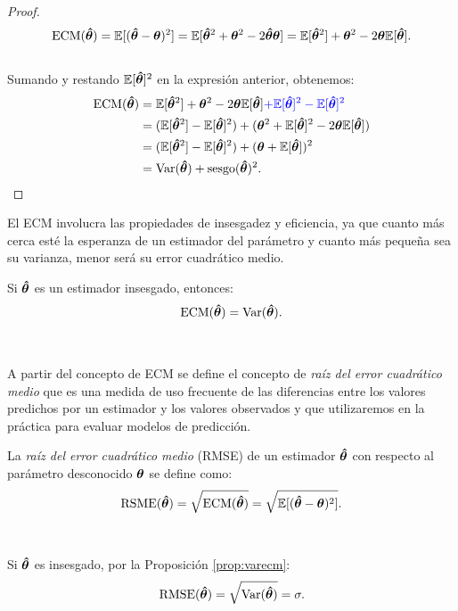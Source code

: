 \documentclass[oneside,openright,titlepage,numbers=noenddot,openany,headinclude,footinclude=true,
cleardoublepage=empty,abstractoff,BCOR=5mm,paper=a4,fontsize=12pt,main=spanish]{scrreprt}
\begin{document}
\begin{proof}
 $$\text{ECM}(\bm{\hat{\theta}})=\mathbb{E}[(\bm{\hat{\theta}}-\bm{\theta})^2]=\mathbb{E}[\bm{\hat{\theta}}^2+\bm{\theta}^2-2\bm{\hat{\theta}} \bm{\theta}]=\mathbb{E}[\bm{\hat{\theta}}^2]+\bm{\theta}^2-2\bm{\theta}\mathbb{E}[\bm{\hat{\theta}}].$$\\
Sumando y restando $\mathbb{E}[\bm{\hat{\theta}}]^2$ en la expresión anterior, obtenemos:\\
  \begin{equation*}
  \begin{split}
 \text{ECM}(\bm{\hat{\theta}})&=\mathbb{E}[\bm{\hat{\theta}}^2]+\bm{\theta}^2-2\bm{\theta}\mathbb{E}[\bm{\hat{\theta}}]\textcolor{blue}{+\mathbb{E}[\bm{\hat{\theta}}]^2-\mathbb{E}[\bm{\hat{\theta}}]^2}\\
 &=(\mathbb{E}[\bm{\hat{\theta}}^2]-\mathbb{E}[\bm{\hat{\theta}}]^2)+(\bm{\theta}^2+\mathbb{E}[\bm{\hat{\theta}}]^2-2\bm{\theta}\mathbb{E}[\bm{\hat{\theta}}])\\
 &=(\mathbb{E}[\bm{\hat{\theta}}^2]-\mathbb{E}[\bm{\hat{\theta}}]^2)+(\bm{\theta}+\mathbb{E}[\bm{\hat{\theta}}])^2\\
 &=\text{Var}(\bm{\hat{\theta}})+\text{sesgo}(\bm{\hat{\theta}})^2.
  \end{split}
  \end{equation*} 
\end{proof}

El ECM involucra las propiedades de insesgadez y
eficiencia, ya que cuanto más cerca esté la esperanza de un estimador del parámetro y cuanto más pequeña sea su varianza, menor será su error cuadrático medio.\\

\begin{proposition} \label{prop:varecm}
Si $\bm{\hat{\theta}}$ es un estimador insesgado, entonces: $$\text{ECM}(\bm{\hat{\theta}})=\text{Var}(\bm{\hat{\theta}}).$$ 
\end{proposition}\

A partir del concepto de ECM se define el concepto de \textit{raíz del error cuadrático medio} que es una medida de uso frecuente de las diferencias entre los valores predichos por un estimador y los valores observados y que utilizaremos en la práctica para evaluar modelos de predicción.\\

\begin{definition}
La \textit{raíz del error cuadrático medio} (RMSE) de un estimador $\bm{\hat{\theta}}$ con respecto al parámetro desconocido $\bm{\theta}$ se define como: $$\text{RSME}(\bm{\hat{\theta}})=\sqrt{\text{ECM}(\bm{\hat{\theta}})}=\sqrt{\mathbb{E}[(\bm{\hat{\theta}}-\bm{\theta})^2]}.$$
\end{definition}\

\begin{remark}
Si $\bm{\hat{\theta}}$ es insesgado, por la Proposición \ref{prop:varecm}: $$\text{RMSE}(\bm{\hat{\theta}})=\sqrt{\text{Var}(\bm{\hat{\theta}})}=\sigma.$$
\end{remark}
\end{document}
